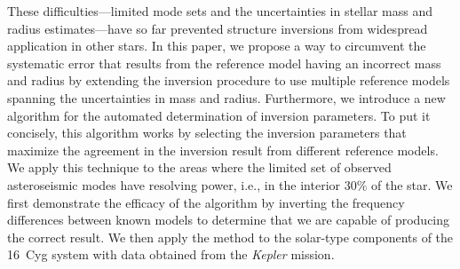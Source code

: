 \vspace{1cm}

These difficulties---limited mode sets and the uncertainties in stellar mass and radius estimates---have so far prevented structure inversions from widespread application in other stars. 
In this paper, we propose a way to circumvent the systematic error that results from the reference model having an incorrect mass and radius by extending the inversion procedure to use multiple reference models spanning the uncertainties in mass and radius. 
Furthermore, we introduce a new algorithm for the automated determination of inversion parameters. 
To put it concisely, this algorithm works by selecting the inversion parameters that maximize the agreement in the inversion result from different reference models. 
We apply this technique to the areas where the limited set of observed asteroseismic modes have resolving power, i.e., in the interior $30\%$ of the star. 
We first demonstrate the efficacy of the algorithm by inverting the frequency differences between known models to determine that we are capable of producing the correct result. 
We then apply the method to the solar-type components of the 16~Cyg system with data obtained from the \emph{Kepler} mission. 





%
%
%
%
